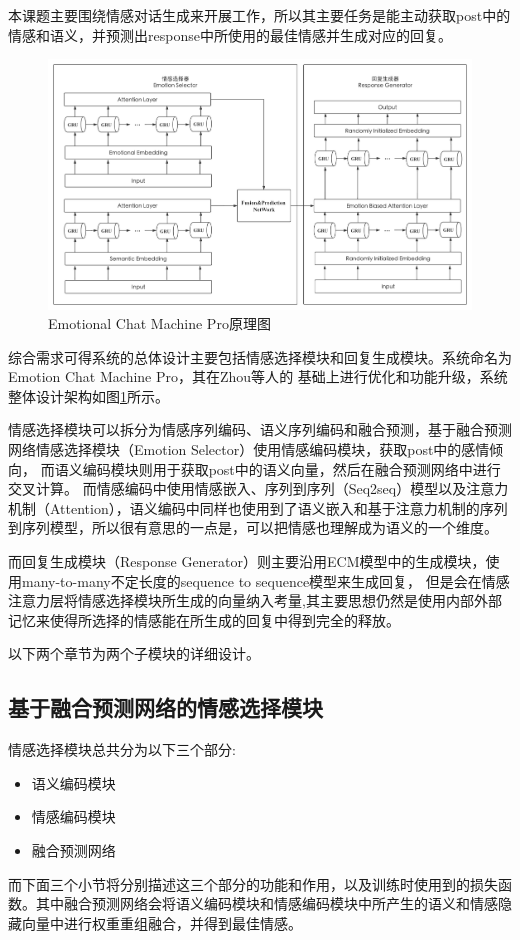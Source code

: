 \documentclass[supercite]{HustGraduPaper}
\theoremstyle{definition}
\begin{document}
本课题主要围绕情感对话生成来开展工作，所以其主要任务是能主动获取post中的情感和语义，并预测出response中所使用的最佳情感并生成对应的回复。
\begin{figure}[H] %
  \centering %
  \includegraphics[width=1\textwidth]{images/ECMP.png} %
  \caption{Emotional Chat Machine Pro原理图} %
  \label{Fig.ECMP} %
\end{figure}
综合需求可得系统的总体设计主要包括情感选择模块和回复生成模块。系统命名为Emotion Chat Machine Pro，其在Zhou等人\cite{DBLP:journals/corr/ZhouHZZL17}的
基础上进行优化和功能升级，系统整体设计架构如图\ref{Fig.ECMP}所示。

情感选择模块可以拆分为情感序列编码、语义序列编码和融合预测，基于融合预测网络情感选择模块\cite{wei2019emotion}（Emotion Selector）使用情感编码模块，获取post中的感情倾向，
而语义编码模块则用于获取post中的语义向量，然后在融合预测网络中进行交叉计算。
而情感编码中使用情感嵌入、序列到序列（Seq2seq）模型以及注意力机制（Attention），语义编码中同样也使用到了语义嵌入和基于注意力机制的序列到序列模型，所以很有意思的一点是，可以把情感也理解成为语义的一个维度。

而回复生成模块（Response Generator）则主要沿用ECM\cite{DBLP:journals/corr/ZhouHZZL17}模型中的生成模块，使用many-to-many不定长度的sequence to sequence模型来生成回复，
但是会在情感注意力层将情感选择模块所生成的向量纳入考量,其主要思想仍然是使用内部外部记忆来使得所选择的情感能在所生成的回复中得到完全的释放。

以下两个章节为两个子模块的详细设计。

\subsection{基于融合预测网络的情感选择模块}
情感选择模块总共分为以下三个部分:
\begin{itemize}
  \item 语义编码模块
  \item 情感编码模块
  \item 融合预测网络
\end{itemize} 
而下面三个小节将分别描述这三个部分的功能和作用，以及训练时使用到的损失函数。其中融合预测网络会将语义编码模块和情感编码模块中所产生的语义和情感隐藏向量中进行权重重组融合，并得到最佳情感。
\end{document}
